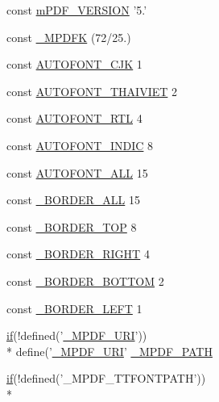 \begin{DoxyCompactItemize}
\item 
const \hyperlink{mpdf_8php_a3e7086f113971110fee51c826d97c58c}{m\-P\-D\-F\-\_\-\-V\-E\-R\-S\-I\-O\-N} '5.'
\item 
const \hyperlink{mpdf_8php_a1620fd00db2354fd97b5e01eba4bb7ab}{\-\_\-\-M\-P\-D\-F\-K} (72/25.)
\item 
const \hyperlink{mpdf_8php_af3d2249ee24b8699ac31e465e2e91369}{A\-U\-T\-O\-F\-O\-N\-T\-\_\-\-C\-J\-K} 1
\item 
const \hyperlink{mpdf_8php_aa2ebc1164b8aefa9886f0824e66cc49a}{A\-U\-T\-O\-F\-O\-N\-T\-\_\-\-T\-H\-A\-I\-V\-I\-E\-T} 2
\item 
const \hyperlink{mpdf_8php_adf1bd08e567f41674b63d1ad2bc6c031}{A\-U\-T\-O\-F\-O\-N\-T\-\_\-\-R\-T\-L} 4
\item 
const \hyperlink{mpdf_8php_a77d04295862453c15c32c84b67c1616d}{A\-U\-T\-O\-F\-O\-N\-T\-\_\-\-I\-N\-D\-I\-C} 8
\item 
const \hyperlink{mpdf_8php_a7610702a00ad8f89228d9bcd7d2402e3}{A\-U\-T\-O\-F\-O\-N\-T\-\_\-\-A\-L\-L} 15
\item 
const \hyperlink{mpdf_8php_a9c8972d2e42ce4b23d9db960299d9327}{\-\_\-\-B\-O\-R\-D\-E\-R\-\_\-\-A\-L\-L} 15
\item 
const \hyperlink{mpdf_8php_ae41857e1278b10fd7d4b73883a626dd9}{\-\_\-\-B\-O\-R\-D\-E\-R\-\_\-\-T\-O\-P} 8
\item 
const \hyperlink{mpdf_8php_a2021fc1de100f2a108b0802f45ec4643}{\-\_\-\-B\-O\-R\-D\-E\-R\-\_\-\-R\-I\-G\-H\-T} 4
\item 
const \hyperlink{mpdf_8php_aa10cef67d347932b52d14cab8c871852}{\-\_\-\-B\-O\-R\-D\-E\-R\-\_\-\-B\-O\-T\-T\-O\-M} 2
\item 
const \hyperlink{mpdf_8php_a71a5c08b796c6176539e10ab2763f2ef}{\-\_\-\-B\-O\-R\-D\-E\-R\-\_\-\-L\-E\-F\-T} 1
\item 
\hyperlink{pdf__parser_8php_af8105e84b42a9ceda5357caeb6c4760b}{if}(!defined('\hyperlink{font__dump_8php_a1ff50e3d84f8270d034f2e9d99c147c0}{\-\_\-\-M\-P\-D\-F\-\_\-\-U\-R\-I}')) \\*
define('\hyperlink{font__dump_8php_a1ff50e3d84f8270d034f2e9d99c147c0}{\-\_\-\-M\-P\-D\-F\-\_\-\-U\-R\-I}' \hyperlink{mpdf_8php_a7d620d14eb10b0b8a3c1420281906e66}{\-\_\-\-M\-P\-D\-F\-\_\-\-P\-A\-T\-H}
\item 
\hyperlink{pdf__parser_8php_af8105e84b42a9ceda5357caeb6c4760b}{if}(!defined('\-\_\-\-M\-P\-D\-F\-\_\-\-T\-T\-F\-O\-N\-T\-P\-A\-T\-H')) \\*

\end{DoxyCompactItemize}
